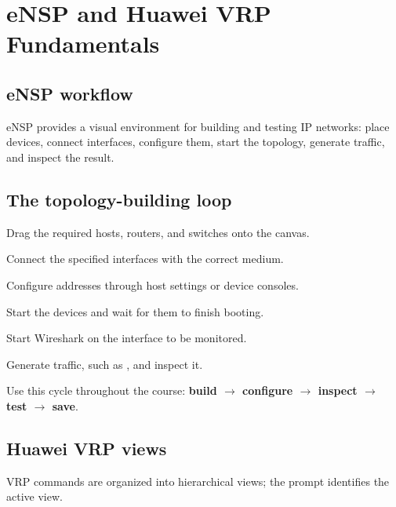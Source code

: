\chapter{eNSP and Huawei VRP Fundamentals}\label{ch:ensp-vrp}

\section{eNSP workflow}
eNSP provides a visual environment for building and testing IP networks: place devices, connect interfaces, configure them, start the topology, generate traffic, and inspect the result.


\section{The topology-building loop}
\begin{netsteps}
\item Drag the required hosts, routers, and switches onto the canvas.
\item Connect the specified interfaces with the correct medium.
\item Configure addresses through host settings or device consoles.
\item Start the devices and wait for them to finish booting.
\item Start Wireshark on the interface to be monitored.
\item Generate traffic, such as , and inspect it.
\end{netsteps}

\begin{keyidea}
Use this cycle throughout the course: \textbf{build $\rightarrow$ configure $\rightarrow$ inspect $\rightarrow$ test $\rightarrow$ save}.
\end{keyidea}

\section{Huawei VRP views}
VRP commands are organized into hierarchical views; the prompt identifies the active view.

